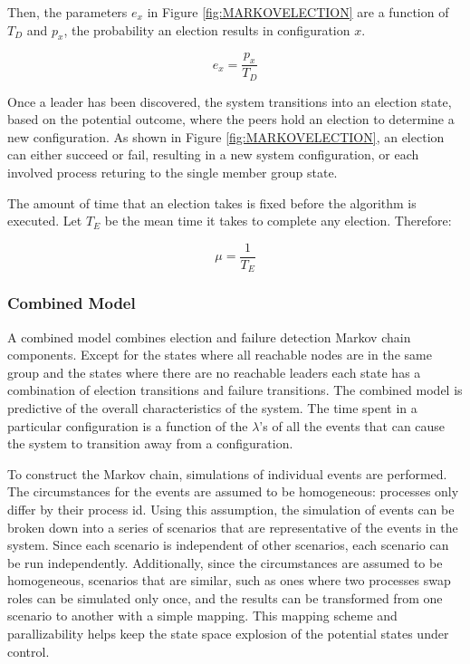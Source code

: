 Then, the parameters $e_x$ in Figure \ref{fig:MARKOVELECTION} are a function of $T_{D}$ and $p_{x}$,
the probability an election results in configuration $x$.

\begin{equation}
e_x = \frac{p_{x}}{T_{D}}
\end{equation}

Once a leader has been discovered, the system transitions into an election state, based on the
potential outcome, where the peers hold an election to determine a new configuration. As shown
in Figure \ref{fig:MARKOVELECTION}, an election can either succeed or fail, resulting in a new system
configuration, or each involved process returing to the single member group state.
 
The amount of time that an election takes is fixed before the algorithm is executed. 
Let $T_{E}$ be the mean time it takes to complete any election. Therefore:

\begin{equation}
\mu = \frac{1}{T_{E}}
\end{equation}

\subsubsection{Combined Model}

A combined model combines election and failure detection Markov chain components. Except for the
states where all reachable nodes are in the same group and the states where there are no reachable
leaders each state has a combination of election transitions and failure transitions.                                                        
The combined model is predictive of the overall characteristics of the system. The
time spent in a particular configuration is a function of the $\lambda$'s of all the
events that can cause the system to transition away from a configuration. 

To construct the Markov chain, simulations of individual events are performed. The circumstances
for the events are assumed to be homogeneous: processes only differ by their process id.
Using this assumption, the simulation of events can be broken down into a series of scenarios
that are representative of the events in the system. Since each scenario is independent of other
scenarios, each scenario can be run independently.  Additionally, since the circumstances
are assumed to be homogeneous, scenarios that are similar, such as ones where two processes
swap roles can be simulated only once, and the results can be transformed from one scenario
to another with a simple mapping. This mapping scheme and parallizability helps keep the
state space explosion of the potential states under control.

